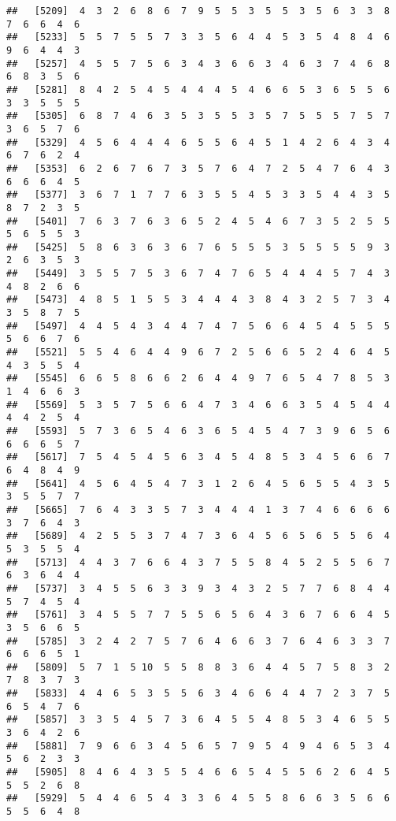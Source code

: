 \documentclass[
]{book}
\begin{document}
\begin{verbatim}
##   [5209]  4  3  2  6  8  6  7  9  5  5  3  5  5  3  5  6  3  3  8  7  6  6  4  6
##   [5233]  5  5  7  5  5  7  3  3  5  6  4  4  5  3  5  4  8  4  6  9  6  4  4  3
##   [5257]  4  5  5  7  5  6  3  4  3  6  6  3  4  6  3  7  4  6  8  6  8  3  5  6
##   [5281]  8  4  2  5  4  5  4  4  4  5  4  6  6  5  3  6  5  5  6  3  3  5  5  5
##   [5305]  6  8  7  4  6  3  5  3  5  5  3  5  7  5  5  5  7  5  7  3  6  5  7  6
##   [5329]  4  5  6  4  4  4  6  5  5  6  4  5  1  4  2  6  4  3  4  6  7  6  2  4
##   [5353]  6  2  6  7  6  7  3  5  7  6  4  7  2  5  4  7  6  4  3  6  6  6  4  5
##   [5377]  3  6  7  1  7  7  6  3  5  5  4  5  3  3  5  4  4  3  5  8  7  2  3  5
##   [5401]  7  6  3  7  6  3  6  5  2  4  5  4  6  7  3  5  2  5  5  5  6  5  5  3
##   [5425]  5  8  6  3  6  3  6  7  6  5  5  5  3  5  5  5  5  9  3  2  6  3  5  3
##   [5449]  3  5  5  7  5  3  6  7  4  7  6  5  4  4  4  5  7  4  3  4  8  2  6  6
##   [5473]  4  8  5  1  5  5  3  4  4  4  3  8  4  3  2  5  7  3  4  3  5  8  7  5
##   [5497]  4  4  5  4  3  4  4  7  4  7  5  6  6  4  5  4  5  5  5  5  6  6  7  6
##   [5521]  5  5  4  6  4  4  9  6  7  2  5  6  6  5  2  4  6  4  5  4  3  5  5  4
##   [5545]  6  6  5  8  6  6  2  6  4  4  9  7  6  5  4  7  8  5  3  1  4  6  6  3
##   [5569]  5  3  5  7  5  6  6  4  7  3  4  6  6  3  5  4  5  4  4  4  4  2  5  4
##   [5593]  5  7  3  6  5  4  6  3  6  5  4  5  4  7  3  9  6  5  6  6  6  6  5  7
##   [5617]  7  5  4  5  4  5  6  3  4  5  4  8  5  3  4  5  6  6  7  6  4  8  4  9
##   [5641]  4  5  6  4  5  4  7  3  1  2  6  4  5  6  5  5  4  3  5  3  5  5  7  7
##   [5665]  7  6  4  3  3  5  7  3  4  4  4  1  3  7  4  6  6  6  6  3  7  6  4  3
##   [5689]  4  2  5  5  3  7  4  7  3  6  4  5  6  5  6  5  5  6  4  5  3  5  5  4
##   [5713]  4  4  3  7  6  6  4  3  7  5  5  8  4  5  2  5  5  6  7  6  3  6  4  4
##   [5737]  3  4  5  5  6  3  3  9  3  4  3  2  5  7  7  6  8  4  4  5  7  4  5  4
##   [5761]  3  4  5  5  7  7  5  5  6  5  6  4  3  6  7  6  6  4  5  3  5  6  6  5
##   [5785]  3  2  4  2  7  5  7  6  4  6  6  3  7  6  4  6  3  3  7  6  6  6  5  1
##   [5809]  5  7  1  5 10  5  5  8  8  3  6  4  4  5  7  5  8  3  2  7  8  3  7  3
##   [5833]  4  4  6  5  3  5  5  6  3  4  6  6  4  4  7  2  3  7  5  6  5  4  7  6
##   [5857]  3  3  5  4  5  7  3  6  4  5  5  4  8  5  3  4  6  5  5  3  6  4  2  6
##   [5881]  7  9  6  6  3  4  5  6  5  7  9  5  4  9  4  6  5  3  4  5  6  2  3  3
##   [5905]  8  4  6  4  3  5  5  4  6  6  5  4  5  5  6  2  6  4  5  5  5  2  6  8
##   [5929]  5  4  4  6  5  4  3  3  6  4  5  5  8  6  6  3  5  6  6  5  5  6  4  8

\end{verbatim}
\end{document}

